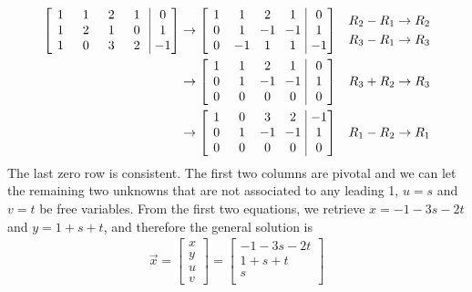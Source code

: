 \begin{solution}
\begin{align*}
\left[\begin{array}{@{\,}wc{10pt}wc{10pt}wc{10pt}wc{10pt}|wc{10pt}@{\,}}
1 & 1 & 2 & 1 & 0 \\
1 & 2 & 1 & 0 & 1 \\
1 & 0 & 3 & 2 & -1
\end{array}\right] 
& \to 
\left[\begin{array}{@{\,}wc{10pt}wc{10pt}wc{10pt}wc{10pt}|wc{10pt}@{\,}}
1 & 1 & 2 & 1 & 0 \\
0 & 1 & -1 & -1 & 1 \\
0 & -1 & 1 & 1 & -1
\end{array}\right] 
& \begin{aligned}
R_2 - R_1 &\to R_2 \\
R_3 - R_1 &\to R_3
\end{aligned} \\
& \to 
\left[\begin{array}{@{\,}wc{10pt}wc{10pt}wc{10pt}wc{10pt}|wc{10pt}@{\,}}
1 & 1 & 2 & 1 & 0 \\
0 & 1 & -1 & -1 & 1 \\
0 & 0 & 0 & 0 & 0
\end{array}\right] 
& R_3 + R_2 \to R_3 \\
& \to 
\left[\begin{array}{@{\,}wc{10pt}wc{10pt}wc{10pt}wc{10pt}|wc{10pt}@{\,}}
1 & 0 & 3 & 2 & -1 \\
0 & 1 & -1 & -1 & 1 \\
0 & 0 & 0 & 0 & 0
\end{array}\right] 
& R_1 - R_2 \to R_1
\end{align*} 
The last zero row is consistent. The first two columns are pivotal and we can let the remaining two unknowns that are not associated to any leading 1, $u=s$ and $v=t$ be free variables. From the first two equations, we retrieve $x = -1 - 3s - 2t$ and $y = 1 + s + t$, and therefore the general solution is
\begin{align*}
\vec{x} = 
\begin{bmatrix}
x \\
y \\
u \\
v
\end{bmatrix} 
=
\begin{bmatrix}
-1 - 3s - 2t \\
1 + s + t \\
s \\

\end{bmatrix}
\end{align*}
\end{solution}
